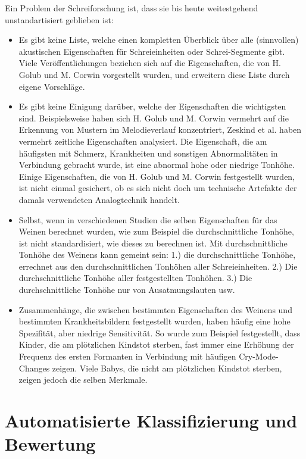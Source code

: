 Ein Problem der Schreiforschung ist, dass sie bis heute weitestgehend unstandartisiert geblieben ist: \cite[S. 142]{signal}
\begin{itemize}
	\item Es gibt keine Liste, welche einen kompletten Überblick über alle (sinnvollen) akustischen Eigenschaften für Schreieinheiten oder Schrei-Segmente gibt. Viele Veröffentlichungen beziehen sich auf die Eigenschaften, die von H. Golub und M. Corwin vorgestellt wurden, und erweitern diese Liste durch eigene Vorschläge. 
	\item Es gibt keine Einigung darüber, welche der Eigenschaften die wichtigsten sind. Beispielsweise haben sich H. Golub und M. Corwin \cite{cryModel} vermehrt auf die Erkennung von Mustern im Melodieverlauf konzentriert, Zeskind et al. \cite{rythmic} haben vermehrt zeitliche Eigenschaften analysiert. Die Eigenschaft, die am häufigsten mit Schmerz, Krankheiten und sonstigen Abnormalitäten in Verbindung gebracht wurde, ist eine abnormal hohe oder niedrige Tonhöhe. Einige Eigenschaften, die von H. Golub und M. Corwin festgestellt wurden, ist nicht einmal gesichert, ob es sich nicht doch um technische Artefakte der damals verwendeten Analogtechnik handelt.\cite[S. 84 - 85]{parentalPerception}
	\item Selbst, wenn in verschiedenen Studien die selben Eigenschaften für das Weinen berechnet wurden, wie zum Beispiel die durchschnittliche Tonhöhe, ist nicht standardisiert, wie dieses zu berechnen ist. Mit \glqq durchschnittliche Tonhöhe des Weinens\grqq{} kann gemeint sein: 1.) die durchschnittliche Tonhöhe, errechnet aus den durchschnittlichen Tonhöhen aller Schreieinheiten. 2.) Die durchschnittliche Tonhöhe aller festgestellten Tonhöhen. 3.) Die durchschnittliche Tonhöhe nur von Ausatmungslauten usw.
	\item Zusammenhänge, die zwischen bestimmten Eigenschaften des Weinens und bestimmten Krankheitsbildern festgestellt wurden, haben häufig eine hohe Spezifität, aber niedrige Sensitivität. So wurde zum Beispiel festgestellt, dass Kinder, die am plötzlichen Kindstot sterben, fast immer eine Erhöhung der Frequenz des ersten Formanten in Verbindung mit häufigen Cry-Mode-Changes zeigen. Viele Babys, die nicht am plötzlichen Kindstot sterben, zeigen jedoch die selben Merkmale.\cite[S. 85]{parentalPerception}
\end{itemize}

\section{Automatisierte Klassifizierung und Bewertung}
\label{sec:learning}

